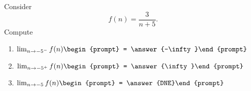 \documentclass{ximera}
\author{Bart Snapp}
\begin{document}
\begin{exercise}
Consider 
\[
f(n) = \frac{3}{n+5}.
\]
Compute
\begin{enumerate}
\item $\lim_{n\to -5^- } f(n) \begin{prompt} = \answer{-\infty}\end{prompt}$
\item $\lim_{n\to -5^+ } f(n) \begin{prompt} = \answer{\infty}\end{prompt}$
\item $\lim_{n\to -5 } f(n) \begin{prompt} = \answer{DNE}\end{prompt}$
\end{enumerate}
\end{exercise}
\end{document}
